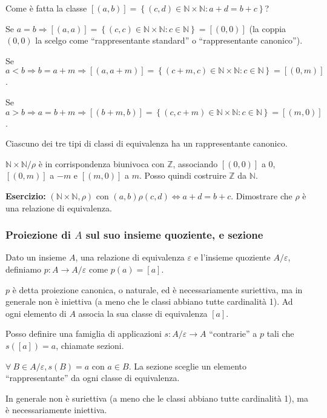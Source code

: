 Come \`e fatta la classe $[(a,b)] = \left \{ (c,d) \in \mathbb{N} \times \mathbb{N} : a + d = b + c \right\}$?

Se $a = b \Rightarrow [(a,a)] = \left \{ (c,c) \in \mathbb{N} \times \mathbb{N} : c \in \mathbb{N} \right\} = [(0,0)]$ (la coppia $(0,0)$ la scelgo come ``rappresentante standard'' o ``rappresentante canonico'').

Se $a < b \Rightarrow b = a + m \Rightarrow [(a,a+m)] = \left \{ (c + m, c) \in \mathbb{N} \times \mathbb{N} : c \in \mathbb{N}\right\} = [(0,m)]$.

Se $a > b \Rightarrow a = b + m \Rightarrow [(b + m, b)] = \left \{ (c , c+ m) \in \mathbb{N} \times \mathbb{N} : c \in \mathbb{N}\right\} = [(m,0)]$.

Ciascuno dei tre tipi di classi di equivalenza ha un rappresentante canonico.

$\mathbb{N} \times \mathbb{N} / \rho$ \`e in corrispondenza biunivoca con $\mathbb{Z}$, associando $[(0,0)]$ a 0, $[(0,m)]$ a $-m$ e $[(m,0)]$ a $m$. Posso quindi costruire $\mathbb{Z}$ da $\mathbb{N}$.

\textbf{Esercizio:} $(\mathbb{N} \times \mathbb{N}, \rho)$ con $(a,b) \rho (c,d) \Leftrightarrow a + d = b + c$. Dimostrare che $\rho$ \`e una relazione di equivalenza.

\vspace{5cm}

\subsubsection{Proiezione di $A$ sul suo insieme quoziente, e sezione}

\begin{defn}[Proiezione]
Dato un insieme $A$, una relazione di equivalenza $\varepsilon$ e l'insieme quoziente $A / \varepsilon$, definiamo $p : A \to A / \varepsilon $ come $ p(a) = [a]$.
\end{defn}
$p$ \`e detta proiezione canonica, o naturale, ed \`e necessariamente suriettiva, ma in generale non \`e iniettiva (a meno che le classi abbiano tutte cardinalit\`a 1). Ad ogni elemento di $A$ associa la sua classe di equivalenza $[a]$.

Posso definire una famiglia di applicazioni $s : A / \varepsilon \to A $ ``contrarie'' a $p$ tali che $s([a]) = a$, chiamate sezioni.
\begin{defn}[Sezione]
$\forall \ B \in A / \varepsilon , s(B) = a$ con $a \in B$. La sezione sceglie un elemento ``rappresentante'' da ogni classe di equivalenza. 
\end{defn}
In generale non \`e suriettiva (a meno che le classi abbiano tutte cardinalit\`a 1), ma \`e necessariamente iniettiva.

